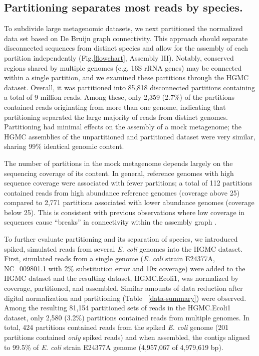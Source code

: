 \documentclass{pnastwo}
\begin{document}
\begin{article}
\subsection*{Partitioning separates most reads by species.}  To subdivide large metagenomic datasets, we next partitioned
the normalized data set based on De Bruijn graph connectivity.  This approach should separate disconnected sequences from distinct species and allow for the assembly of each partition independently (Fig.\ref{flowchart}, Assembly III).  Notably, conserved regions shared by multiple genomes (e.g. 16S rRNA genes) may be connected within a single partition, and we examined these partitions through the HGMC dataset.  Overall, it was partitioned into 85,818 disconnected partitions containing a total of 9
million reads. Among these, only 2,359 (2.7\%) of the partitions contained reads
originating from more than one genome, indicating that partitioning separated
the large majority of reads from distinct genomes.  Partitioning had minimal effects on the assembly of a mock metagenome; the HGMC assemblies of the unpartitioned and
partitioned dataset were very similar, sharing 99\% identical genomic content.

The number of partitions in the mock metagenome depends largely on the sequencing coverage of its content. In general, reference genomes with high sequence coverage were associated with
fewer partitions; a total of 112 partitions contained reads from
high abundance reference genomes (coverage above 25) compared to 2,771
partitions associated with lower abundance genomes (coverage below 25). This is
consistent with previous observations where low coverage in sequences cause
``breaks'' in connectivity within the assembly graph
\cite{Chaisson:2008p1373,Pevzner:2001p1374}.

To further evaluate partitioning and its separation of species, we introduced spiked, simulated
reads from several \emph{E. coli} genomes into the HGMC dataset. First, simulated reads
from a single genome (\emph{E. coli} strain E24377A, NC\_009801.1 with 2\%
substitution error and 10x coverage) were added to the HGMC dataset and the
resulting dataset, HGMC.Ecoli1, was normalized by coverage, partitioned, and
assembled. Similar amounts of data reduction after digital normalization and
partitioning (Table ~\ref{data-summary}) were observed. Among the resulting 81,154
partitioned sets of reads in the HGMC.Ecoli1 dataset, only 2,580 (3.2\%)
partitions contained reads from multiple genomes. In total, 424 partitions
contained reads from the spiked \emph{E. coli} genome (201 partitions contained
\emph{only} spiked reads) and when assembled, the contigs aligned to 99.5\% of
\emph{E. coli} strain E24377A genome (4,957,067 of 4,979,619 bp).


\end{article}
\end{document}
